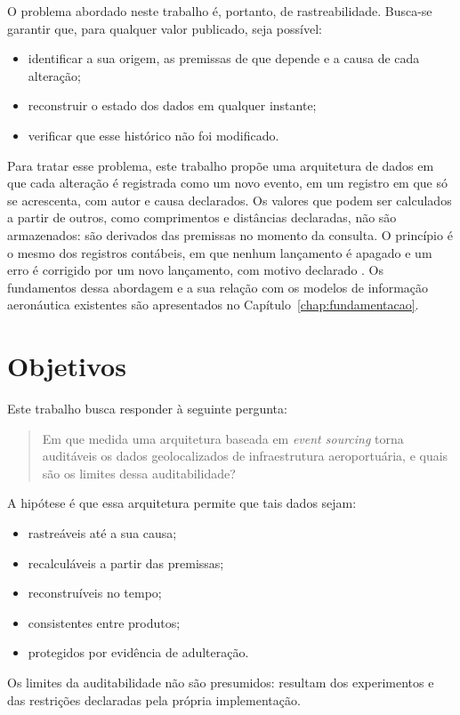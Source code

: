 O problema abordado neste trabalho é, portanto, de rastreabilidade. Busca-se garantir que, para qualquer valor publicado, seja possível:
\begin{itemize}
    \item identificar a sua origem, as premissas de que depende e a causa de cada alteração;
    \item reconstruir o estado dos dados em qualquer instante;
    \item verificar que esse histórico não foi modificado.
\end{itemize}

Para tratar esse problema, este trabalho propõe uma arquitetura de dados em que cada alteração é registrada como um novo evento, em um registro em que só se acrescenta, com autor e causa declarados. Os valores que podem ser calculados a partir de outros, como comprimentos e distâncias declaradas, não são armazenados: são derivados das premissas no momento da consulta. O princípio é o mesmo dos registros contábeis, em que nenhum lançamento é apagado e um erro é corrigido por um novo lançamento, com motivo declarado \cite{helland2016}. Os fundamentos dessa abordagem e a sua relação com os modelos de informação aeronáutica existentes são apresentados no Capítulo~\ref{chap:fundamentacao}.

\section{Objetivos}

Este trabalho busca responder à seguinte pergunta:

\begin{quote}
Em que medida uma arquitetura baseada em \textit{event sourcing} torna auditáveis os dados geolocalizados de infraestrutura aeroportuária, e quais são os limites dessa auditabilidade?
\end{quote}

A hipótese é que essa arquitetura permite que tais dados sejam:
\begin{itemize}
    \item rastreáveis até a sua causa;
    \item recalculáveis a partir das premissas;
    \item reconstruíveis no tempo;
    \item consistentes entre produtos;
    \item protegidos por evidência de adulteração.
\end{itemize}
Os limites da auditabilidade não são presumidos: resultam dos experimentos e das restrições declaradas pela própria implementação.


